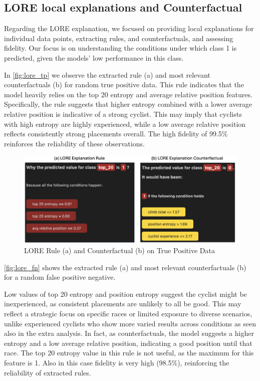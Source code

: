 \subsection{LORE local explanations and Counterfactual}
Regarding the LORE explanation, we focused on providing local explanations for individual data points, extracting rules, and counterfactuals, and assessing fidelity. Our focus is on understanding the conditions under which class 1 is predicted, given the models' low performance in this class.

In \autoref{fig:lore_tp} we observe the extracted rule (a) and most relevant counterfactuals (b) for random true positive data.
This rule indicates that the model heavily relies on the top 20 entropy and average relative position features. Specifically, the rule suggests that higher entropy combined with a lower average relative position is indicative of a strong cyclist. This may imply that cyclists with high entropy are highly experienced, while a low average relative position reflects consistently strong placements overall.
The high fidelity of 99.5\% reinforces the reliability of these observations.

\begin{figure}[H]
    \centering
    \includegraphics[width=0.7\linewidth]{images//XAI/lore_tp.png}
    \vspace{-5pt}
    \caption{ \small{LORE Rule (a) and Counterfactual (b) on True Positive Data}}
    \label{fig:lore_tp}
\end{figure}

\noindent \autoref{fig:lore_fn} shows the extracted rule (a) and most relevant counterfactuals (b) for a random false positive negative.

Low values of top 20 entropy and position entropy suggest the cyclist might be inexperienced, as consistent placements are unlikely to all be good. This may reflect a strategic focus on specific races or limited exposure to diverse scenarios, unlike experienced cyclists who show more varied results across conditions as seen also in the extra analysis. In fact, as counterfactuals, the model suggests a higher entropy and a low average relative position, indicating a good position until that race. The top 20 entropy value in this rule is not useful, as the maximum for this feature is 1.
Also in this case fidelity is very high (98.5\%), reinforcing the reliability of extracted rules.

